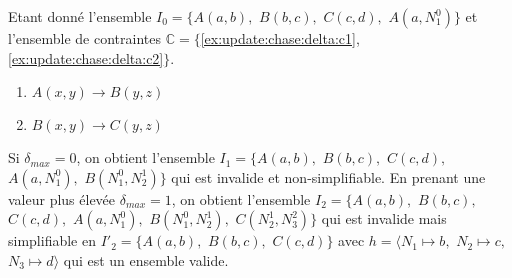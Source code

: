 \begin{example}
    \label{ex:update:chase:delta}
    Etant donné l'ensemble $I_0 = \{A(a, b),$ $B(b, c),$ $C(c, d),$ $A(a, N_1^0)\}$ et l'ensemble de contraintes $\mathbb{C} = \{$\ref{ex:update:chase:delta:c1}, \ref{ex:update:chase:delta:c2}$\}$.
    \begin{multicols}{2}
        \begin{enumerate}[label=\textbf{$c_\arabic*$ :},ref=$c_\arabic*$]
            \centering
            \item $A(x, y) \to B(y, z)$ \label{ex:update:chase:delta:c1}
            \item $B(x, y) \to C(y, z)$ \label{ex:update:chase:delta:c2}
        \end{enumerate}
    \end{multicols}
    Si $\delta_{max} = 0$, on obtient l'ensemble $I_1 = \{A(a, b),$ $B(b, c),$ $C(c, d),$ $A(a, N_1^0),$ $B(N_1^0, N_2^1)\}$ qui est invalide et non-simplifiable.
    En prenant une valeur plus élevée $\delta_{max} = 1$, on obtient l'ensemble $I_2 = \{A(a, b),$ $B(b, c),$ $C(c, d),$ $A(a, N_1^0),$ $B(N_1^0, N_2^1),$ $C(N_2^1, N_3^2)\}$ qui est invalide mais simplifiable en $I'_2 = \{A(a, b),$ $B(b, c),$ $C(c, d)\}$ avec $h = \langle N_1 \mapsto b,$ $N_2 \mapsto c,$ $N_3 \mapsto d \rangle$ qui est un ensemble valide.
\end{example}

